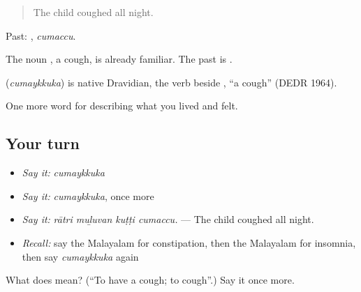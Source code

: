 \begin{quote}
The child coughed all night.
\end{quote}

Past: , \emph{cumaccu}.

The noun , a cough, is already familiar. The past is .

\begin{cousinweb}
\textbf{} (\emph{cumaykkuka}) is native Dravidian, the verb beside , \textquotedblleft{}a cough\textquotedblright{} (DEDR 1964).
\end{cousinweb}

\begin{grammarlens}[title={What you've built}]
One more word for describing what you lived and felt.
\end{grammarlens}

\subsection*{Your turn}
\begin{itemize}
\raggedright
  \item \emph{Say it:} \emph{cumaykkuka}
  \item \emph{Say it:} \emph{cumaykkuka}, once more
  \item \emph{Say it:} \emph{rātri muḻuvan kuṭṭi cumaccu.} — The child coughed all night.
  \item \emph{Recall:} say the Malayalam for constipation, then the Malayalam for insomnia, then say \emph{cumaykkuka} again
\end{itemize}

\begin{tcolorbox}[breakable,colback=teal!4,colframe=teal!35!black,title={Before you move on}]
What does  mean? (\textquotedblleft{}To have a cough; to cough\textquotedblright{}.) Say it once more.
\end{tcolorbox}

